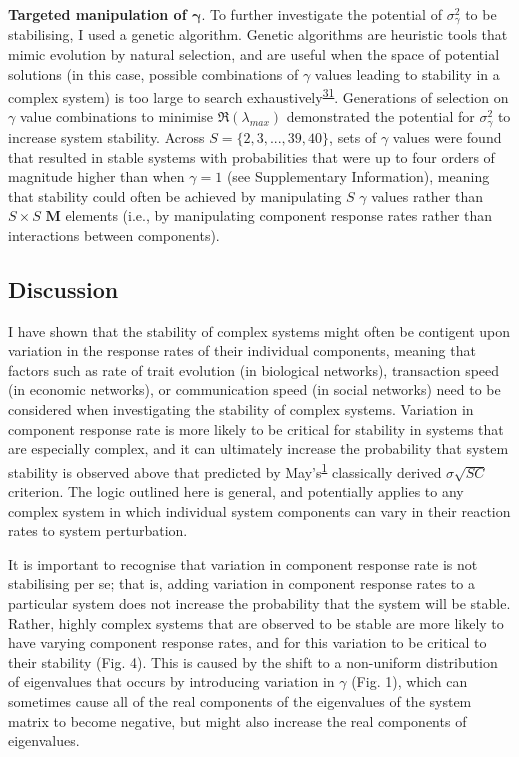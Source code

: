 \documentclass[]{article}
\begin{document}
\textbf{Targeted manipulation of \(\boldsymbol{\gamma}\)}. To further
investigate the potential of \(\sigma^{2}_{\gamma}\) to be stabilising,
I used a genetic algorithm. Genetic algorithms are heuristic tools that
mimic evolution by natural selection, and are useful when the space of
potential solutions (in this case, possible combinations of \(\gamma\)
values leading to stability in a complex system) is too large to search
exhaustively\textsuperscript{\protect\hyperlink{ref-Hamblin2013}{31}}.
Generations of selection on \(\gamma\) value combinations to minimise
\(\Re(\lambda_{max})\) demonstrated the potential for
\(\sigma^{2}_{\gamma}\) to increase system stability. Across
\(S = \{2, 3, ..., 39, 40\}\), sets of \(\gamma\) values were found that
resulted in stable systems with probabilities that were up to four
orders of magnitude higher than when \(\gamma = 1\) (see Supplementary
Information), meaning that stability could often be achieved by
manipulating \(S\) \(\gamma\) values rather than \(S \times S\)
\(\mathbf{M}\) elements (i.e., by manipulating component response rates
rather than interactions between components).

\subsection{Discussion}\label{discussion}

I have shown that the stability of complex systems might often be
contigent upon variation in the response rates of their individual
components, meaning that factors such as rate of trait evolution (in
biological networks), transaction speed (in economic networks), or
communication speed (in social networks) need to be considered when
investigating the stability of complex systems. Variation in component
response rate is more likely to be critical for stability in systems
that are especially complex, and it can ultimately increase the
probability that system stability is observed above that predicted by
May's\textsuperscript{\protect\hyperlink{ref-May1972}{1}} classically
derived \(\sigma \sqrt{SC}\) criterion. The logic outlined here is
general, and potentially applies to any complex system in which
individual system components can vary in their reaction rates to system
perturbation.

It is important to recognise that variation in component response rate
is not stabilising per se; that is, adding variation in component
response rates to a particular system does not increase the probability
that the system will be stable. Rather, highly complex systems that are
observed to be stable are more likely to have varying component response
rates, and for this variation to be critical to their stability (Fig.
4). This is caused by the shift to a non-uniform distribution of
eigenvalues that occurs by introducing variation in \(\gamma\) (Fig. 1),
which can sometimes cause all of the real components of the eigenvalues
of the system matrix to become negative, but might also increase the
real components of eigenvalues.
\end{document}
